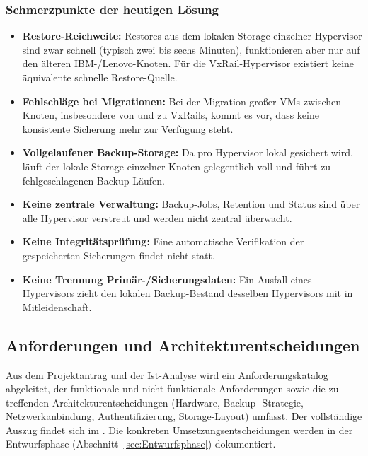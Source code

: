 \subsubsection*{Schmerzpunkte der heutigen Lösung}
\begin{itemize}
    \item \textbf{Restore-Reichweite:} Restores aus dem lokalen
          Storage einzelner Hypervisor sind zwar schnell (typisch
          zwei bis sechs Minuten), funktionieren aber nur auf den
          älteren IBM-/Lenovo-Knoten. Für die VxRail-Hypervisor
          existiert keine äquivalente schnelle Restore-Quelle.
    \item \textbf{Fehlschläge bei Migrationen:} Bei der Migration
          großer \acp{VM} zwischen Knoten, insbesondere von und zu
          VxRails, kommt es vor, dass keine konsistente Sicherung
          mehr zur Verfügung steht.
    \item \textbf{Vollgelaufener Backup-Storage:} Da pro Hypervisor
          lokal gesichert wird, läuft der lokale Storage einzelner
          Knoten gelegentlich voll und führt zu fehlgeschlagenen
          Backup-Läufen.
    \item \textbf{Keine zentrale Verwaltung:} Backup-Jobs, Retention
          und Status sind über alle Hypervisor verstreut und werden
          nicht zentral überwacht.
    \item \textbf{Keine Integritätsprüfung:} Eine automatische
          Verifikation der gespeicherten Sicherungen findet nicht
          statt.
    \item \textbf{Keine Trennung Primär-/Sicherungsdaten:} Ein
          Ausfall eines Hypervisors zieht den lokalen Backup-Bestand
          desselben Hypervisors mit in Mitleidenschaft.
\end{itemize}


\subsection{Anforderungen und Architekturentscheidungen}
\label{sec:Anforderungsanalyse}
Aus dem Projektantrag und der Ist-Analyse wird ein Anforderungskatalog
abgeleitet, der funktionale und nicht-funktionale Anforderungen
sowie die zu treffenden Architekturentscheidungen (Hardware, Backup-
Strategie, Netzwerkanbindung, Authentifizierung, Storage-Layout)
umfasst. Der vollständige Auszug findet sich im
. Die konkreten Umsetzungsentscheidungen
werden in der Entwurfsphase
(Abschnitt~\ref{sec:Entwurfsphase}) dokumentiert.


